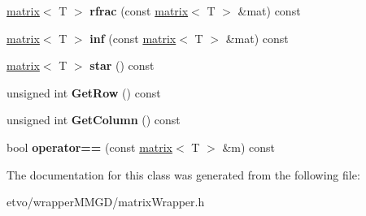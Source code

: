 \begin{DoxyCompactItemize}
\item 
\mbox{\label{classetvo_i_i_1_1matrix_a837e32704f2ffd4222ade7e3bf511613}} 
\mbox{\hyperlink{classetvo_i_i_1_1matrix}{matrix}}$<$ T $>$ {\bfseries rfrac} (const \mbox{\hyperlink{classetvo_i_i_1_1matrix}{matrix}}$<$ T $>$ \&mat) const
\item 
\mbox{\label{classetvo_i_i_1_1matrix_ae8113541eac59b1d4e306d7e28ce9025}} 
\mbox{\hyperlink{classetvo_i_i_1_1matrix}{matrix}}$<$ T $>$ {\bfseries inf} (const \mbox{\hyperlink{classetvo_i_i_1_1matrix}{matrix}}$<$ T $>$ \&mat) const
\item 
\mbox{\label{classetvo_i_i_1_1matrix_a398e9ebe11c9a3656a0dea8f2f558dc8}} 
\mbox{\hyperlink{classetvo_i_i_1_1matrix}{matrix}}$<$ T $>$ {\bfseries star} () const
\item 
\mbox{\label{classetvo_i_i_1_1matrix_a2aee163327f9b8df41cce9a227d13710}} 
unsigned int {\bfseries Get\+Row} () const
\item 
\mbox{\label{classetvo_i_i_1_1matrix_a4993db01a58342feec5578ffa4b41e26}} 
unsigned int {\bfseries Get\+Column} () const
\item 
\mbox{\label{classetvo_i_i_1_1matrix_ab294d43a3e8f7bb49202516d53b65775}} 
bool {\bfseries operator==} (const \mbox{\hyperlink{classetvo_i_i_1_1matrix}{matrix}}$<$ T $>$ \&m) const
\end{DoxyCompactItemize}


The documentation for this class was generated from the following file\+:\begin{DoxyCompactItemize}
\item 
etvo/wrapper\+M\+M\+G\+D/matrix\+Wrapper.\+h\end{DoxyCompactItemize}
